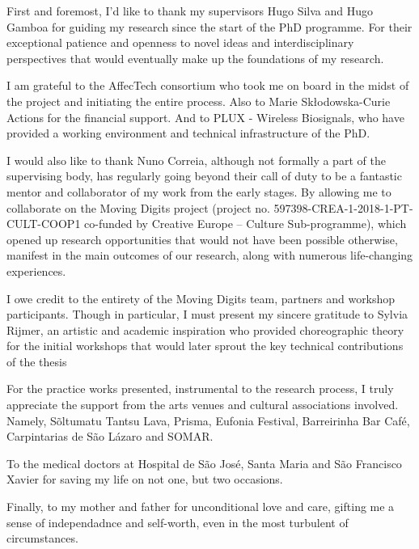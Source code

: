 

\begin{ntacknowledgements}

First and foremost, I'd like to thank my supervisors Hugo Silva and Hugo Gamboa for guiding my research since the start of the PhD programme. For their exceptional patience and openness to novel ideas and interdisciplinary perspectives that would eventually make up the foundations of my research.

I am grateful to the AffecTech consortium who took me on board in the midst of the project and initiating the entire process. Also to Marie Skłodowska-Curie Actions for the financial support. And to PLUX - Wireless Biosignals, who have provided a working environment and technical infrastructure of the PhD.

I would also like to thank Nuno Correia, although not formally a part of the supervising body, has regularly going beyond their call of duty to be a fantastic mentor and collaborator of my work from the early stages. By allowing me to collaborate on the Moving Digits project (project no. 597398-CREA-1-2018-1-PT-CULT-COOP1 co-funded by Creative Europe – Culture Sub-programme), which opened up research opportunities that would not have been possible otherwise, manifest in the main outcomes of our research, along with numerous life-changing experiences.

I owe credit to the entirety of the Moving Digits team, partners and workshop participants. Though in particular, I must present my sincere gratitude to Sylvia Rijmer, an artistic and academic inspiration who provided choreographic theory for the initial workshops that would later sprout the key technical contributions of the thesis
    
For the practice works presented, instrumental to the research process, I truly appreciate the support from the arts venues and cultural associations involved. Namely, Sõltumatu Tantsu Lava, Prisma, Eufonia Festival, Barreirinha Bar Café, Carpintarias de São Lázaro and SOMAR.

To the medical doctors at Hospital de São José, Santa Maria and São Francisco Xavier for saving my life on not one, but two occasions.

Finally, to my mother and father for unconditional love and care, gifting me a sense of independadnce and self-worth, even in the most turbulent of circumstances.

\end{ntacknowledgements}